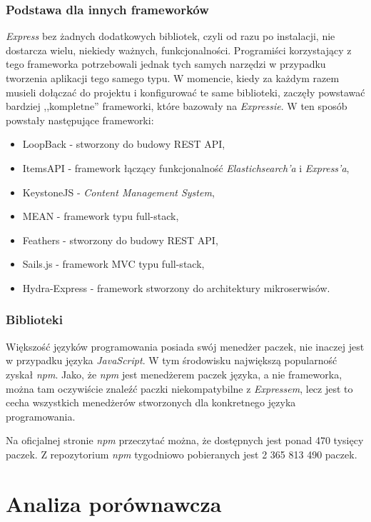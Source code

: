 \documentclass[mgr,oneside]{mgr}
\begin{document}
\subsection{Podstawa dla innych frameworków}
\textit{Express} bez żadnych dodatkowych bibliotek, czyli od razu po instalacji, nie dostarcza wielu, niekiedy ważnych, funkcjonalności. Programiści korzystający z tego frameworka potrzebowali jednak tych samych narzędzi w przypadku tworzenia aplikacji tego samego typu. W momencie, kiedy za każdym razem musieli dołączać do projektu i konfigurować te same biblioteki, zaczęły powstawać bardziej ,,kompletne'' frameworki, które bazowały na \textit{Expressie}. W ten sposób powstały następujące frameworki:
\begin{itemize}
  \item LoopBack - stworzony do budowy REST API,
  \item ItemsAPI - framework łączący funkcjonalność \textit{Elastichsearch'a} i \textit{Express'a},
  \item KeystoneJS - \textit{Content Management System},
  \item MEAN - framework typu full-stack,
  \item Feathers - stworzony do budowy REST API,
  \item Sails.js - framework MVC typu full-stack,
  \item Hydra-Express - framework stworzony do architektury mikroserwisów.
\end{itemize}

\subsection{Biblioteki}
Większość języków programowania posiada swój menedżer paczek, nie inaczej jest w przypadku języka \textit{JavaScript}. W tym środowisku największą popularność zyskał \textit{npm}. Jako, że \textit{npm} jest menedżerem paczek języka, a nie frameworka, można tam oczywiście znaleźć paczki niekompatybilne z \textit{Expressem}, lecz jest to cecha wszystkich menedżerów stworzonych dla konkretnego języka programowania.

Na oficjalnej stronie \textit{npm} \cite{npm_site} przeczytać można, że dostępnych jest ponad 470 tysięcy paczek. Z repozytorium \textit{npm} tygodniowo pobieranych jest 2 365 813 490 paczek.

\chapter{Analiza porównawcza}
\end{document}
